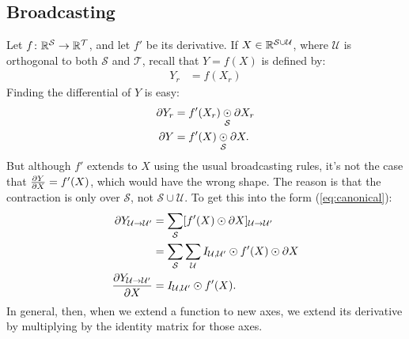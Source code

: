 \subsection{Broadcasting}

Let $f \colon \mathbb{R}^\mathcal{S} \rightarrow \mathbb{R}^\mathcal{T}$, and let $f'$ be its derivative. If $X \in \mathbb{R}^{\mathcal{S} \cup \mathcal{U}}$, where $\mathcal{U}$ is orthogonal to both $\mathcal{S}$ and $\mathcal{T}$, recall that $Y = f(X)$ is defined by:
\begin{align*}
  Y_r &= f(X_r)
\end{align*}
Finding the differential of $Y$ is easy:
\begin{align*}
  \partial Y_r &= f'(X_r) \ndot{\mathcal{S}} \partial X_r \\
  \partial Y &= f'(X) \ndot{\mathcal{S}} \partial X.
\end{align*}
But although $f'$ extends to $X$ using the usual broadcasting rules, it's not the case that $\frac{\partial Y}{\partial X} = f'(X)$, which would have the wrong shape. The reason is that the contraction is only over $\mathcal{S}$, not $\mathcal{S}\cup\mathcal{U}$. To get this into the form (\ref{eq:canonical}):
\begin{align*}
  \partial Y_{\mathcal{U}\rightarrow\mathcal{U'}} &= \sum\limits_{\substack{\mathcal{S}}} [f'(X) \odot \partial X]_{\mathcal{U}\rightarrow\mathcal{U'}} \\
  &= \sum\limits_{\substack{\mathcal{S}}} \sum\limits_{\substack{\mathcal{U}}} I_{\mathcal{U},\mathcal{U'}} \odot f'(X) \odot \partial X \\
  \frac{\partial Y_{\mathcal{U}\rightarrow\mathcal{U'}}}{\partial X} &= I_{\mathcal{U},\mathcal{U'}} \odot f'(X).
\end{align*}
In general, then, when we extend a function to new axes, we extend its derivative by multiplying by the identity matrix for those axes.
